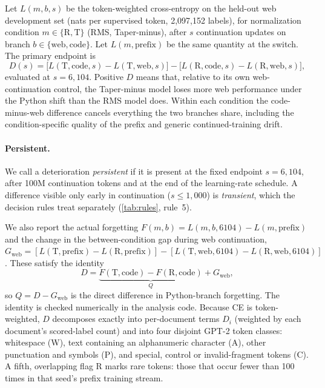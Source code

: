 \documentclass[11pt]{article}
\begin{document}
Let $L(m, b, s)$ be the token-weighted cross-entropy on the held-out web development set (nats per supervised
token, 2{,}097{,}152 labels), for normalization condition $m \in \{\mathrm{R}, \mathrm{T}\}$ (RMS, Taper-minus),
after $s$ continuation updates on branch $b \in \{\text{web}, \text{code}\}$. Let $L(m,\text{prefix})$ be the
same quantity at the switch. The primary endpoint is
\begin{equation}
  D(s) = \big[L(\mathrm{T},\text{code},s) - L(\mathrm{T},\text{web},s)\big] - \big[L(\mathrm{R},\text{code},s) - L(\mathrm{R},\text{web},s)\big],
  \label{eq:d}
\end{equation}
evaluated at $s = 6{,}104$. Positive $D$ means that, relative to its own web-continuation control, the Taper-minus
model loses more web performance under the Python shift than the RMS model does. Within each condition the
code-minus-web difference cancels everything the two branches share, including the condition-specific quality of
the prefix and generic continued-training drift.

\paragraph{Persistent.} We call a deterioration \emph{persistent} if it is present at the fixed endpoint
$s = 6{,}104$, after 100M continuation tokens and at the end of the learning-rate schedule. A difference visible
only early in continuation ($s \le 1{,}000$) is \emph{transient}, which the decision rules treat separately
(\cref{tab:rules}, rule~5).

We also report the actual forgetting $F(m,b) = L(m,b,6104) - L(m,\text{prefix})$ and the change in the
between-condition gap during web continuation,
$G_{\text{web}} = [L(\mathrm{T},\text{prefix}) - L(\mathrm{R},\text{prefix})] -
[L(\mathrm{T},\text{web},6104) - L(\mathrm{R},\text{web},6104)]$. These satisfy the identity
\begin{equation}
  D = \underbrace{F(\mathrm{T},\text{code}) - F(\mathrm{R},\text{code})}_{Q} + G_{\text{web}},
\end{equation}
so $Q = D - G_{\text{web}}$ is the direct difference in Python-branch forgetting. The identity is checked
numerically in the analysis code. Because CE is token-weighted, $D$ decomposes exactly into per-document terms
$D_i$ (weighted by each document's scored-label count) and into four disjoint GPT-2 token classes: whitespace
(W), text containing an alphanumeric character (A), other punctuation and symbols (P), and special, control or
invalid-fragment tokens (C). A fifth, overlapping flag R marks rare tokens: those that occur fewer than 100 times
in that seed's prefix training stream.
\end{document}
